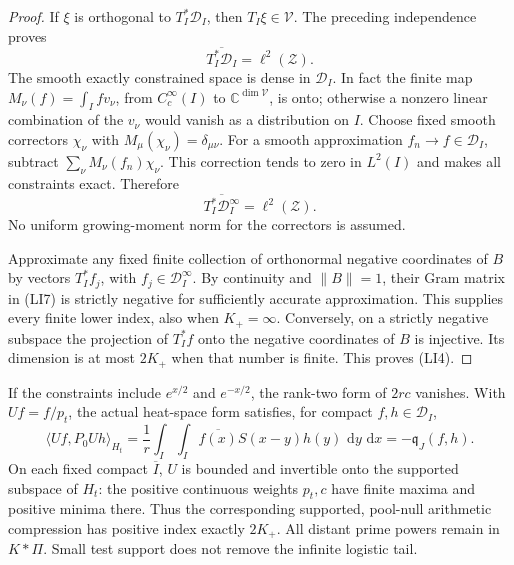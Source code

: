\documentclass[11pt]{article}
\theoremstyle{remark}\newtheorem{remark}[theorem]{Remark}
\newcommand{\dd}{\,\mathrm d}
\begin{document}
\begin{proof}
If \(\xi\) is orthogonal to \(T_I^*\mathcal D_I\), then
\(T_I\xi\in\mathcal V\). The preceding independence proves
\[
 \overline{T_I^*\mathcal D_I}=\ell^2(\mathcal Z).
 \tag{LI10}
\]
The smooth exactly constrained space is dense in \(\mathcal D_I\).
In fact the finite map
\(M_\nu(f)=\int_I f v_\nu\), from \(C_c^\infty(I)\) to
\(\mathbb C^{\dim\mathcal V}\), is onto; otherwise a nonzero
linear combination of the \(v_\nu\) would vanish as a distribution
on \(I\). Choose fixed smooth correctors \(\chi_\nu\) with
\(M_\mu(\chi_\nu)=\delta_{\mu\nu}\). For a smooth approximation
\(f_n\to f\in\mathcal D_I\), subtract
\(\sum_\nu M_\nu(f_n)\chi_\nu\). This correction tends to zero in
\(L^2(I)\) and makes all constraints exact. Therefore
\[
 \overline{T_I^*\mathcal D_I^\infty}=\ell^2(\mathcal Z).
 \tag{LI11}
\]
No uniform growing-moment norm for the correctors is assumed.

Approximate any fixed finite collection of orthonormal negative
coordinates of \(B\) by vectors \(T_I^*f_j\), with
\(f_j\in\mathcal D_I^\infty\). By continuity and \(\|B\|=1\),
their Gram matrix in (LI7) is strictly negative for sufficiently
accurate approximation. This supplies every finite lower index,
also when \(K_+=\infty\). Conversely, on a strictly negative
subspace the projection of \(T_I^*f\) onto the negative
coordinates of \(B\) is injective. Its dimension is at most
\(2K_+\) when that number is finite. This proves (LI4).
\end{proof}

If the constraints include \(e^{x/2}\) and \(e^{-x/2}\), the
rank-two form of \(2rc\) vanishes. With \(Uf=f/p_t\), the actual
heat-space form satisfies, for compact \(f,h\in\mathcal D_I\),
\[
 \langle Uf,P_0 Uh\rangle_{H_t}
  =\frac1r\int_I\int_I\overline{f(x)}S(x-y)h(y)\,\dd y\,\dd x
  =-\mathfrak q_J(f,h).
 \tag{LI12}
\]
On each fixed compact \(\overline I\), \(U\) is bounded and
invertible onto the supported subspace of \(H_t\): the positive
continuous weights \(p_t,c\) have finite maxima and positive
minima there. Thus the corresponding supported, pool-null
arithmetic compression has positive index exactly \(2K_+\).
All distant prime powers remain in \(K*\Pi\). Small test support
does not remove the infinite logistic tail.
\end{document}
